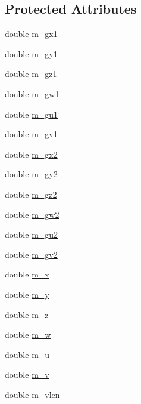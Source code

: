 \subsection*{Protected Attributes}
\begin{DoxyCompactItemize}
\item 
double \hyperlink{classanl_1_1CImplicitGradient_a4f12dfb0f480d8b3050542832c12a4b5}{m\_\-gx1}
\item 
double \hyperlink{classanl_1_1CImplicitGradient_aebb29567d56a290732ccfc31c171394b}{m\_\-gy1}
\item 
double \hyperlink{classanl_1_1CImplicitGradient_a60d54b81927716546e28345ea151574f}{m\_\-gz1}
\item 
double \hyperlink{classanl_1_1CImplicitGradient_ac094bc2fd398a3f4884d218a20266c07}{m\_\-gw1}
\item 
double \hyperlink{classanl_1_1CImplicitGradient_a7ef50f5d3f7a7818f44cd1f71827bca8}{m\_\-gu1}
\item 
double \hyperlink{classanl_1_1CImplicitGradient_a303d31b0ed865b83162d602aad4ba182}{m\_\-gv1}
\item 
double \hyperlink{classanl_1_1CImplicitGradient_acb52c208ec0bce144b8fca1fbd0540dd}{m\_\-gx2}
\item 
double \hyperlink{classanl_1_1CImplicitGradient_a6145742d1a610fb3fe6ac9ea7663e05b}{m\_\-gy2}
\item 
double \hyperlink{classanl_1_1CImplicitGradient_a1356e6293a09177c4f3477ee5e9c0fec}{m\_\-gz2}
\item 
double \hyperlink{classanl_1_1CImplicitGradient_a3169b7fada23d977c1287abbf0226fcd}{m\_\-gw2}
\item 
double \hyperlink{classanl_1_1CImplicitGradient_a497cc3d54c35b1db283801c57d0959b7}{m\_\-gu2}
\item 
double \hyperlink{classanl_1_1CImplicitGradient_afbc43e915297e675271e00dd3947ce36}{m\_\-gv2}
\item 
double \hyperlink{classanl_1_1CImplicitGradient_a1c3763e594df4c09fcb0b7f2185c9e21}{m\_\-x}
\item 
double \hyperlink{classanl_1_1CImplicitGradient_af6d644f116b363fa6703b98d5500aa14}{m\_\-y}
\item 
double \hyperlink{classanl_1_1CImplicitGradient_a7ea97d44c5a4a997df530e710ac2fa12}{m\_\-z}
\item 
double \hyperlink{classanl_1_1CImplicitGradient_af7a55f5ddae3894bab88fe9e21c18b8a}{m\_\-w}
\item 
double \hyperlink{classanl_1_1CImplicitGradient_a78bcc451e75b20289767d76dd16fe23d}{m\_\-u}
\item 
double \hyperlink{classanl_1_1CImplicitGradient_a19197113abab9ff11020c5fc0909ec82}{m\_\-v}
\item 
double \hyperlink{classanl_1_1CImplicitGradient_a388e92b55317b22809b8b2e42bb2cb03}{m\_\-vlen}
\end{DoxyCompactItemize}


